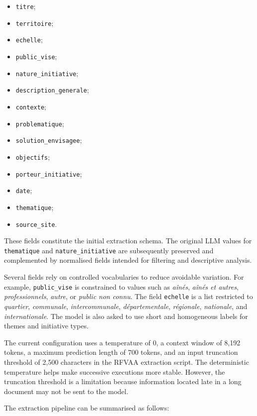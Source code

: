 \begin{itemize}
    \item \texttt{titre};
    \item \texttt{territoire};
    \item \texttt{echelle};
    \item \texttt{public\_vise};
    \item \texttt{nature\_initiative};
    \item \texttt{description\_generale};
    \item \texttt{contexte};
    \item \texttt{problematique};
    \item \texttt{solution\_envisagee};
    \item \texttt{objectifs};
    \item \texttt{porteur\_initiative};
    \item \texttt{date};
    \item \texttt{thematique};
    \item \texttt{source\_site}.
\end{itemize}

These fields constitute the initial extraction schema. The original LLM values
for \texttt{thematique} and \texttt{nature\_initiative} are subsequently
preserved and complemented by normalised fields intended for filtering and
descriptive analysis.

Several fields rely on controlled vocabularies to reduce avoidable variation.
For example, \texttt{public\_vise} is constrained to values such as
\textit{aînés}, \textit{aînés et autres}, \textit{professionnels},
\textit{autre}, or \textit{public non connu}. The field \texttt{echelle} is a
list restricted to \textit{quartier}, \textit{communale},
\textit{intercommunale}, \textit{départementale}, \textit{régionale},
\textit{nationale}, and \textit{internationale}. The model is also asked to use
short and homogeneous labels for themes and initiative types.

The current configuration uses a temperature of 0, a context window of 8,192
tokens, a maximum prediction length of 700 tokens, and an input truncation
threshold of 2,500 characters in the RFVAA extraction script. The deterministic
temperature helps make successive executions more stable. However, the
truncation threshold is a limitation because information located late in a long
document may not be sent to the model.

The extraction pipeline can be summarised as follows:

